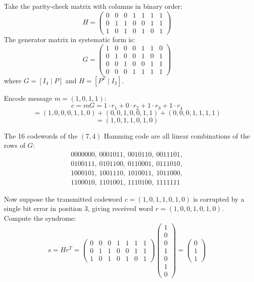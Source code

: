 \begin{example}
Take the parity-check matrix with columns in binary order:
\[
H = \begin{pmatrix}
0 & 0 & 0 & 1 & 1 & 1 & 1 \\
0 & 1 & 1 & 0 & 0 & 1 & 1 \\
1 & 0 & 1 & 0 & 1 & 0 & 1
\end{pmatrix}
\]
The generator matrix in systematic form is:
\[
G = \begin{pmatrix}
1 & 0 & 0 & 0 & 1 & 1 & 0 \\
0 & 1 & 0 & 0 & 1 & 0 & 1 \\
0 & 0 & 1 & 0 & 0 & 1 & 1 \\
0 & 0 & 0 & 1 & 1 & 1 & 1
\end{pmatrix}
\]
where $G = [I_4 \mid P]$ and $H = [P^T \mid I_3]$.

Encode message $m = (1,0,1,1)$:
\[
c = mG = 1\cdot r_1 + 0\cdot r_2 + 1\cdot r_3 + 1\cdot r_4
\]
\[
= (1,0,0,0,1,1,0) + (0,0,1,0,0,1,1) + (0,0,0,1,1,1,1)
\]
\[
= (1,0,1,1,0,1,0)
\]

The 16 codewords of the $(7,4)$ Hamming code are all linear combinations of the rows of $G$:
\[
\begin{array}{ll}
0000000,\ 0001011,\ 0010110,\ 0011101,\\
0100111,\ 0101100,\ 0110001,\ 0111010,\\
1000101,\ 1001110,\ 1010011,\ 1011000,\\
1100010,\ 1101001,\ 1110100,\ 1111111
\end{array}
\]

Now suppose the transmitted codeword $c = (1,0,1,1,0,1,0)$ is corrupted by a single bit error in position 3, giving received word $r = (1,0,0,1,0,1,0)$. Compute the syndrome:
\[
s = H r^T = \begin{pmatrix}0&0&0&1&1&1&1\\0&1&1&0&0&1&1\\1&0&1&0&1&0&1\end{pmatrix} \begin{pmatrix}1\\0\\0\\1\\0\\1\\0\end{pmatrix}
= \begin{pmatrix}0\\1\\1\end{pmatrix}
\]


\end{example}
